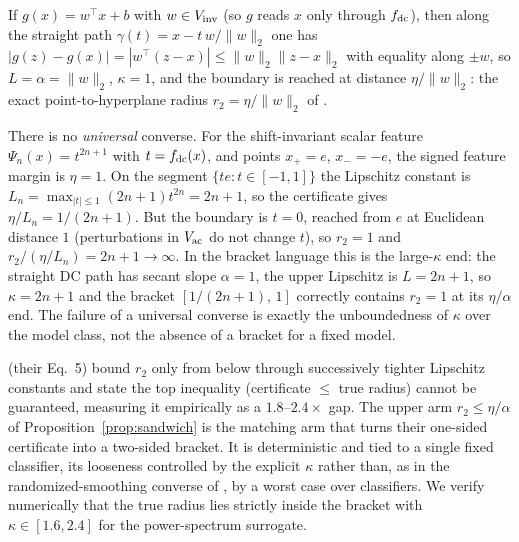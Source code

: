 \begin{corollary}\label{cor:linear-exact-app}
If $g(x)=w^\top x+b$ with $w\in V_{\mathrm{inv}}$ (so $g$ reads $x$ only through $f_{\mathrm{dc}}$),
then along the straight path $\gamma(t)=x-t\,w/\lVert w\rVert_2$ one has
$|g(z)-g(x)|=|w^\top(z-x)|\le\lVert w\rVert_2\lVert z-x\rVert_2$ with equality
along $\pm w$, so $L=\alpha=\lVert w\rVert_2$, $\kappa=1$, and the boundary is
reached at distance $\eta/\lVert w\rVert_2$: the exact point-to-hyperplane
radius $r_2=\eta/\lVert w\rVert_2$ of \citet{hein2017formal}.
\end{corollary}

\begin{remark}\label{rem:tpow-app}
There is no \emph{universal} converse. For the shift-invariant scalar feature
$\Psi_n(x)=t^{2n+1}$ with $t=f_{\mathrm{dc}}(x)$, and points $x_+=e$, $x_-=-e$, the signed
feature margin is $\eta=1$. On the segment $\{te:t\in[-1,1]\}$ the Lipschitz
constant is $L_n=\max_{|t|\le1}(2n+1)t^{2n}=2n+1$, so the certificate gives
$\eta/L_n=1/(2n+1)$. But the boundary is $t=0$, reached from $e$ at Euclidean
distance $1$ (perturbations in $V_{\mathrm{ac}}$ do not change $t$), so $r_2=1$ and
$r_2/(\eta/L_n)=2n+1\to\infty$. In the bracket language this is the large-$\kappa$
end: the straight DC path has secant slope $\alpha=1$, the upper Lipschitz is
$L=2n+1$, so $\kappa=2n+1$ and the bracket $[1/(2n+1),\,1]$ correctly contains
$r_2=1$ at its $\eta/\alpha$ end. The failure of a universal converse is exactly
the unboundedness of $\kappa$ over the model class, not the absence of a bracket
for a fixed model.
\end{remark}

\begin{remark}\label{rem:tsuzuku-app}
\citet{tsuzuku2018lipschitz} (their Eq.~5) bound $r_2$ only from below through
successively tighter Lipschitz constants and state the top inequality
(certificate $\le$ true radius) cannot be guaranteed, measuring it empirically as
a $1.8$--$2.4\times$ gap. The upper arm $r_2\le\eta/\alpha$ of
Proposition~\ref{prop:sandwich} is the matching arm that turns their
one-sided certificate into a two-sided bracket. It is deterministic and tied to a
single fixed classifier, its looseness controlled by the explicit $\kappa$
rather than, as in the randomized-smoothing converse of \citet{cohen2019certified},
by a worst case over classifiers. We verify numerically that the true radius lies
strictly inside the bracket with $\kappa\in[1.6,2.4]$ for the power-spectrum
surrogate.
\end{remark}

